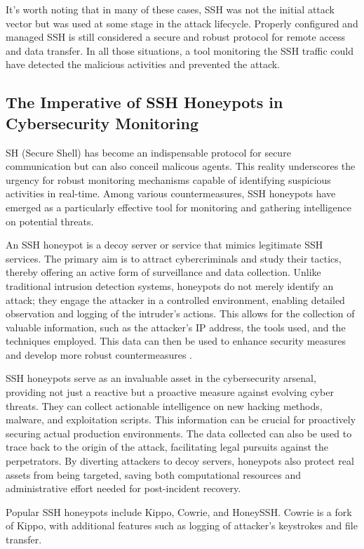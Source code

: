     It's worth noting that in many of these cases, SSH was not the initial attack vector but was used at some stage in the attack lifecycle. Properly configured and managed SSH is still considered a secure and robust protocol for remote access and data transfer. In all those situations, a tool monitoring the SSH traffic could have detected the malicious activities and prevented the attack.

    \subsection{The Imperative of SSH Honeypots in Cybersecurity Monitoring}
    SH (Secure Shell) has become an indispensable protocol for secure communication but can also conceil malicous agents. This reality underscores the urgency for robust monitoring mechanisms capable of identifying suspicious activities in real-time. Among various countermeasures, SSH honeypots have emerged as a particularly effective tool for monitoring and gathering intelligence on potential threats. 

    An SSH honeypot is a decoy server or service that mimics legitimate SSH services. The primary aim is to attract cybercriminals and study their tactics, thereby offering an active form of surveillance and data collection. Unlike traditional intrusion detection systems, honeypots do not merely identify an attack; they engage the attacker in a controlled environment, enabling detailed observation and logging of the intruder's actions. This allows for the collection of valuable information, such as the attacker's IP address, the tools used, and the techniques employed. This data can then be used to enhance security measures and develop more robust countermeasures \cite{ClassificationMalware21}. 

    SSH honeypots serve as an invaluable asset in the cybersecurity arsenal, providing not just a reactive but a proactive measure against evolving cyber threats. They can collect actionable intelligence on new hacking methods, malware, and exploitation scripts. This information can be crucial for proactively securing actual production environments. The data collected can also be used to trace back to the origin of the attack, facilitating legal pursuits against the perpetrators. By diverting attackers to decoy servers, honeypots also protect real assets from being targeted, saving both computational resources and administrative effort needed for post-incident recovery.

    Popular SSH honeypots include Kippo, Cowrie, and HoneySSH.  Cowrie is a fork of Kippo, with additional features such as logging of attacker's keystrokes and file transfer. 

